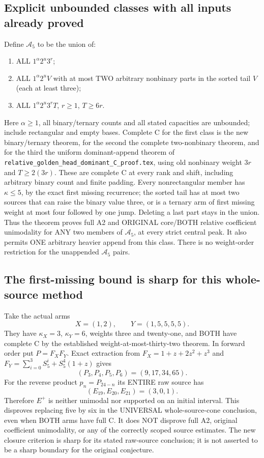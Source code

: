 \subsection{Explicit unbounded classes with all inputs already proved}
Define $\mathcal A_5$ to be the union of:
\begin{enumerate}
\item ALL $1^\alpha2^u3^r$;
\item ALL $1^\alpha2^uV$ with at most TWO arbitrary nonbinary
parts in the sorted tail $V$ (each at least three);
\item ALL $1^\alpha2^u3^rT$, $r\ge1$,
$T\ge6r$.
\end{enumerate}
Here $\alpha\ge1$, all binary/ternary counts and all stated capacities
are unbounded; include rectangular and empty bases. Complete C for
the first class is the new binary/ternary theorem, for the second
the complete two-nonbinary theorem, and for the third the uniform
dominant-append theorem of
\texttt{relative\_golden\_head\_dominant\_C\_proof.tex}, using old
nonbinary weight $3r$ and $T\ge2(3r)$. These are complete C at every
rank and shift, including arbitrary binary count and finite padding.
Every nonrectangular member has $\kappa\le5$, by the exact first
missing recurrence; the sorted tail has at most two sources that can
raise the binary value three, or is a ternary arm of first missing
weight at most four followed by one jump. Deleting a last part stays
in the union. Thus the theorem proves full A2 and ORIGINAL core/BOTH
relative coefficient unimodality for ANY two members of $\mathcal A_5$,
at every strict central peak. It also permits ONE arbitrary heavier
append from this class. There is no weight-order restriction for the
unappended $\mathcal A_5$ pairs.

\subsection{The first-missing bound is sharp for this whole-source method}
Take the actual arms
\[
                    X=(1,2),\qquad Y=(1,5,5,5,5).
\]
They have $\kappa_X=3$, $\kappa_Y=6$, weights three and twenty-one,
and BOTH have complete C by the established weight-at-most-thirty-two
theorem. In forward order put $P=F_XF_Y$. Exact extraction from
$F_X=1+z+2z^2+z^3$ and
$F_Y=\sum_{i=0}^3S_5^i+S_5^4(1+z)$ gives
\[
             (P_3,P_4,P_5,P_6)=(9,17,34,65).
\]
For the reverse product $p_n=P_{24-n}$ its ENTIRE raw source has
\[
                 (E_{19},E_{20},E_{21})=(3,0,1).       \tag{2}
\]
Therefore $E^+$ is neither unimodal nor supported on an initial
interval. This disproves replacing five by six in the UNIVERSAL
whole-source-cone conclusion, even when BOTH arms have full C.
It does NOT disprove full A2, original coefficient unimodality, or
any of the correctly scoped source estimates. The new closure
criterion is sharp for its stated raw-source conclusion; it is not
asserted to be a sharp boundary for the original conjecture.

